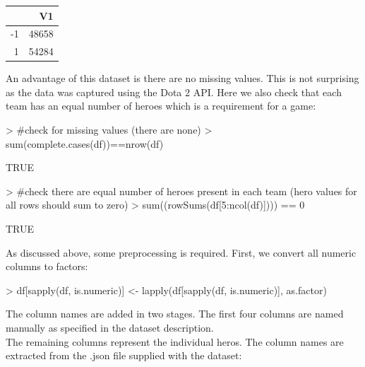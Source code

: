 \documentclass[10pt]{article}
\begin{document}
\begin{table}[ht]
\centering
\begin{tabular}{rr}
  \hline
 & V1 \\ 
  \hline
-1 & 48658 \\ 
  1 & 54284 \\ 
   \hline
\end{tabular}
\end{table}

An advantage of this dataset is there are no missing values. This is not surprising as the data was captured using the Dota 2 API. Here we also check that each team has an equal number of heroes which is a requirement for a game:

\begin{Schunk}
\begin{Sinput}
> #check for missing values (there are none)
> sum(complete.cases(df))==nrow(df)
\end{Sinput}
\begin{Soutput}
[1] TRUE
\end{Soutput}
\begin{Sinput}
> #check there are equal number of heroes present in each team (hero values for all rows should sum to zero)
> sum((rowSums(df[5:ncol(df)]))) == 0
\end{Sinput}
\begin{Soutput}
[1] TRUE
\end{Soutput}
\end{Schunk}

As discussed above, some preprocessing is required. First, we convert all numeric columns to factors:
\begin{Schunk}
\begin{Sinput}
> df[sapply(df, is.numeric)] <- lapply(df[sapply(df, is.numeric)], as.factor)
\end{Sinput}
\end{Schunk}

The column names are added in two stages. The first four columns are named manually as specified in the dataset description.\\
The remaining columns represent the individual heros. The column names are extracted from the .json file supplied with the dataset:
\begin{Schunk}
\end{Schunk}
\end{document}
